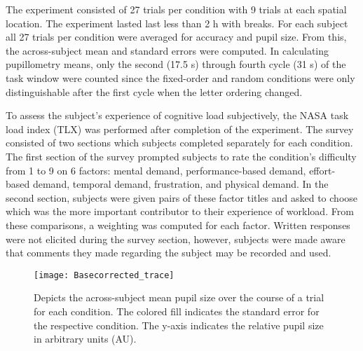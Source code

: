 \documentclass[10pt]{article}
\begin{document}
The experiment consisted of 27 trials per condition
with 9 trials at each spatial location.  The experiment
lasted last less than 2 h with breaks.   For each
subject all 27 trials per condition were averaged for accuracy
and pupil size.  From this, the across-subject mean and
standard errors were computed.  In calculating pupillometry
means, only the second (17.5 s) through fourth cycle (31 s) of
the task window were counted since the fixed-order and random
conditions were only distinguishable after the first cycle
when the letter ordering changed.

To assess the subject's experience of cognitive load subjectively,
the NASA task load index (TLX) was performed after completion
of the experiment\cite{kubler}.  The survey consisted of two
sections which subjects completed separately for each
condition.  The first section of the survey prompted subjects
to rate the condition's difficulty from 1 to 9 on 6 factors:
mental demand, performance-based demand, effort-based demand,
temporal demand, frustration, and physical demand. In the
second section, subjects were given pairs of these factor
titles and asked to choose which was the more important
contributor to their experience of workload.  From these
comparisons, a weighting was computed for each factor.
Written responses were not elicited during the survey section,
however, subjects were made aware that comments they made
regarding the subject may be recorded and used.




\begin{figure}[ht]
  \centering
  \texttt{[image: Basecorrected\_trace]}
  \caption{Depicts the across-subject mean pupil size over the course of a trial
  for each condition.  The colored fill indicates the standard error
  for the respective condition.  The y-axis indicates the
  relative pupil size in arbitrary units (AU).}
  \label{trialtrace}
\end{figure}
\end{document}
